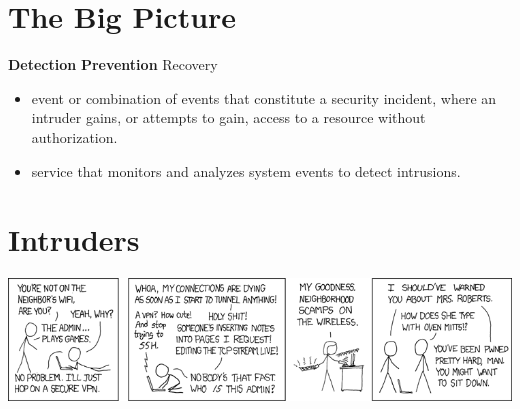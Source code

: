 \mode*




\section{The Big Picture}

\begin{frame}
  \begin{center}
    \textbf{Detection}
    \qquad
    \textbf{Prevention}
    \qquad
    Recovery
  \end{center}
\end{frame}

\begin{frame}
  \begin{definition}[Intrusion]
    \begin{itemize}
      \item event or combination of events that constitute a security incident, 
        where an intruder gains, or attempts to gain, access to a resource 
        without authorization.
    \end{itemize}
  \end{definition}

  \begin{definition}
    \begin{itemize}
      \item service that monitors and analyzes system events to detect 
        intrusions.
    \end{itemize}
  \end{definition}
\end{frame}


\section{Intruders}

\begin{frame}
  \includegraphics[width=\columnwidth]{figs/xkcd-341.png}
\end{frame}

